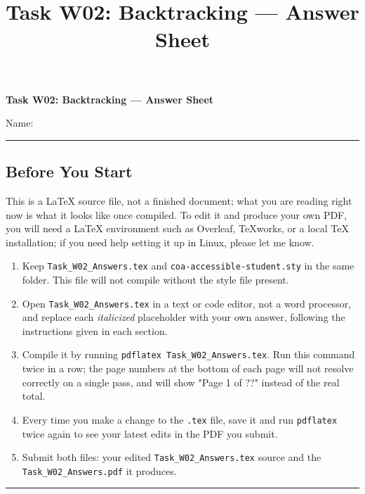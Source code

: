 \documentclass[11pt]{article}
\title{Task W02: Backtracking --- Answer Sheet}
\begin{document}
{\centering
{\Large\bfseries\color{coaNavy} Task W02: Backtracking --- Answer Sheet\par}
\vspace{0.6em}
}
\noindent Name: \underline{\hspace{3.2in}}
\vspace{1em}

\begin{center}
\rule{0.95\linewidth}{0.6pt}
\end{center}
\subsection*{Before You Start}
\noindent
This is a LaTeX source file, not a finished document; what you are reading
right now is what it looks like once compiled. To edit it and produce your
own PDF, you will need a LaTeX environment such as Overleaf, TeXworks, or a
local TeX installation; if you need help setting it up in Linux, please let
me know.

\begin{enumerate}[leftmargin=1.4em]
  \item Keep \texttt{Task\_W02\_Answers.tex} and
        \texttt{coa-accessible-student.sty} in the same folder. This file
        will not compile without the style file present.
  \item Open \texttt{Task\_W02\_Answers.tex} in a text or code editor, not a
        word processor, and replace each \textit{italicized} placeholder
        with your own answer, following the instructions given in each
        section.
  \item Compile it by running \texttt{pdflatex Task\_W02\_Answers.tex}. Run
        this command twice in a row; the page numbers at the bottom of each
        page will not resolve correctly on a single pass, and will show
        "Page 1 of ??" instead of the real total.
  \item Every time you make a change to the \texttt{.tex} file, save it and
        run \texttt{pdflatex} twice again to see your latest edits in the
        PDF you submit.
  \item Submit both files: your edited \texttt{Task\_W02\_Answers.tex}
        source and the \texttt{Task\_W02\_Answers.pdf} it produces.
\end{enumerate}
\begin{center}
\rule{0.95\linewidth}{0.6pt}
\end{center}
\vspace{0.6em}
\end{document}
